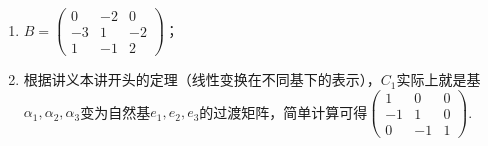 \begin{exercise}
\begin{exgroup}
\begin{answer}
\begin{enumerate}
                \item $B=\begin{pmatrix}
                              0 & -2 & 0 \\ -3 & 1 & -2 \\ 1 & -1 & 2
                          \end{pmatrix}$；

                \item 根据讲义本讲开头的定理（线性变换在不同基下的表示），$C_1$实际上就是基$\alpha_1,\alpha_2,\alpha_3$变为自然基$e_1,e_2,e_3$的过渡矩阵，简单计算可得$\begin{pmatrix}
                              1 & 0 & 0 \\ -1 & 1 & 0 \\ 0 & -1 & 1
                          \end{pmatrix}$.
            \end{enumerate}
        \end{answer}


\end{exgroup}
\end{exercise}
